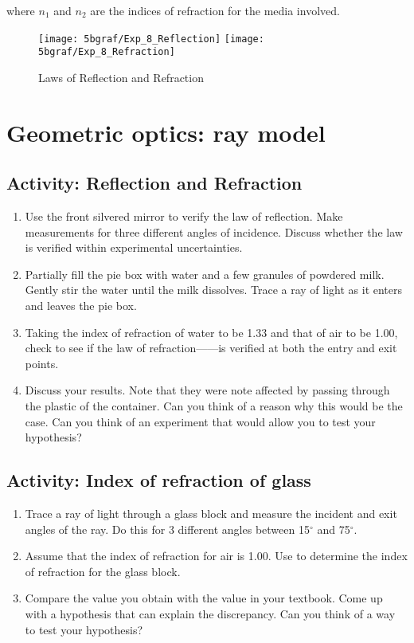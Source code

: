where $n_1$ and $n_2$ are the indices of refraction for the media involved.  


\begin{figure*} \centering
	\texttt{[image: 5bgraf/Exp\_8\_Reflection]}
	\hfill
	\texttt{[image: 5bgraf/Exp\_8\_Refraction]}
 \caption{Laws of Reflection and Refraction}\label{f:rfract}
\end{figure*}
\FloatBarrier

\section{Geometric optics: ray model}

\subsection{Activity: Reflection and Refraction}
\begin{enumerate}
	\item Use the front silvered mirror to verify the law of reflection.  Make measurements for three different angles of incidence.  Discuss whether the law is verified within experimental uncertainties.

	\item Partially fill the pie box with water and a few granules of powdered milk.  Gently stir the water until the milk dissolves.  Trace a ray of light as it enters and leaves the pie box.  
	\item Taking the index of refraction of water to be 1.33 and that of air to be 1.00, check to see if the law of refraction------is verified at both the entry and exit points.  
	\item Discuss your results. Note that they were note affected by passing through the plastic of the container.  Can you think of a reason why this would be the case.  Can you think of an experiment that would allow you to test your hypothesis?
\end{enumerate}
	
\subsection{Activity: Index of refraction of glass}
\begin{enumerate}
\item
	Trace a ray of light through a glass block and measure the incident and exit angles of the ray.  Do this for 3 different angles between 15$^{\circ}$ and 75$^{\circ}$.
	\item Assume that the index of refraction for air is 1.00. Use  to determine the index of refraction for the glass block.
	\item Compare the value you obtain with the value in your textbook.  Come up with a hypothesis that can explain the discrepancy.  Can you think of a way to test your hypothesis?
\end{enumerate}

